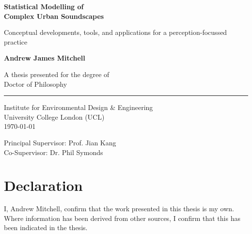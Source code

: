 \documentclass[oneside,fontsize=13pt,titlepage]{scrbook}
\begin{document}
\frontmatter
{}
\begin{titlepage}
      \AddToShipoutPicture*{}
      \begin{center}
            \vspace*{3cm}

            \Huge
            \textbf{Statistical Modelling of\\Complex Urban Soundscapes}

            \vspace{0.5cm}
            \LARGE
            Conceptual developments, tools, and applications for a perception-focussed practice

            \vspace{1.5cm}

            \textbf{Andrew James Mitchell}

            \vfill
            A thesis presented for the degree of\\
            Doctor of Philosophy\\
            \rule[-.5cm]{0.5\textwidth}{1pt}

            \vspace{1.5cm}

            \Large
            Institute for Environmental Design \& Engineering\\
            University College London (UCL)\\
            \today

            \vspace{1cm}

            Principal Supervisor: Prof. Jian Kang\\
            Co-Supervisor: Dr. Phil Symonds

      \end{center}
\end{titlepage}


\restoregeometry


\chapter*{Declaration}
I, Andrew Mitchell, confirm that the work presented in this thesis is my own. Where information has been derived from other sources, I confirm that this has been indicated in the thesis.
\end{document}
